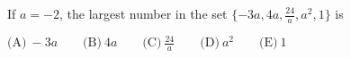 

If $a = - 2$, the largest number in the set $\{ - 3a, 4a, \frac {24}{a}, a^2, 1\}$ is

$\text{(A)}\ -3a \qquad \text{(B)}\ 4a \qquad \text{(C)}\ \frac {24}{a} \qquad \text{(D)}\ a^2 \qquad \text{(E)}\ 1$
